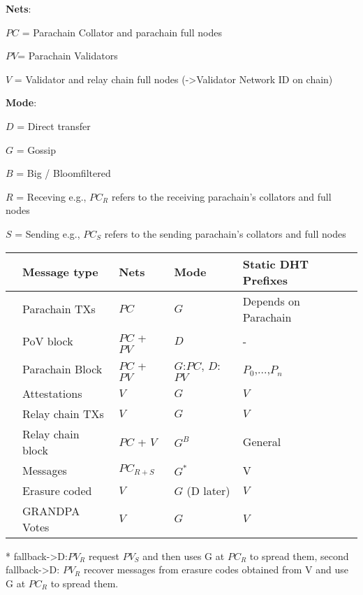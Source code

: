 \textbf{Nets}:

$PC$ = Parachain Collator and parachain full nodes

$PV$= Parachain Validators

$V$ = Validator and relay chain full nodes (->Validator Network ID on chain)

\textbf{Mode}:

$D$ = Direct transfer

$G$ = Gossip

$B$ = Big / Bloomfiltered

$R$ = Receving e.g., $PC_{R}$ refers to the receiving parachain's collators and full nodes

$S$ = Sending e.g., $PC_{S}$ refers to the sending parachain's collators and full nodes

\begin{table}[h]
\begin{tabular}{lllll}
& \textbf{Message type}  & \textbf{Nets}  & \textbf{Mode}  & \textbf{Static DHT Prefixes} \\
\hline
& Parachain TXs  & $PC$   & $G$   &Depends on Parachain\\
& PoV block  & $PC$ + $PV$  & $D$         & - \\
& Parachain Block & $PC$ + $PV$   & $G$:$PC$, $D$:$PV$ &$P_0$,...,$P_n$\\
& Attestations   & $V$   & $G$  & $V$ \\
& Relay chain TXs & $V$    & $G$   & $V$ \\
& Relay chain block & $PC$ + $V$  & $G^B$   & General \\
& Messages  & $PC_{R + S}$ & $G^*$     & V \\
& Erasure coded    & $V$           & $G$ (D later)        &$V$\\
& GRANDPA Votes   &$V$          & $G$      &$V$\\
\end{tabular}
\end{table}

* fallback->D:$PV_{R}$ request $PV_{S}$ and then uses G at $PC_{R}$ to spread them,
second fallback->D: $PV_{R}$ recover messages from erasure codes obtained from V and use G at $PC_{R}$ to spread them.
